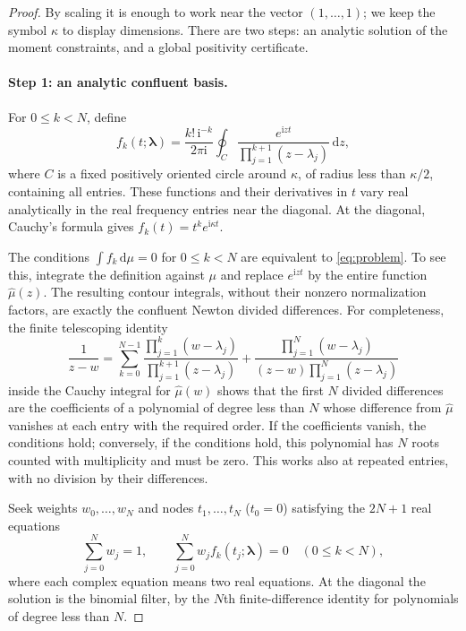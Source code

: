 \documentclass[11pt]{article}
\theoremstyle{remark}\newtheorem{remark}[theorem]{Remark}
\newcommand{\dd}{\,\mathrm d}
\newcommand{\ii}{\mathrm i}
\begin{document}
\begin{proof}
By scaling it is enough to work near the vector $(1,\dots,1)$; we keep the symbol $\kappa$ to display dimensions. There are two steps: an analytic solution of the moment constraints, and a global positivity certificate.

\paragraph{Step 1: an analytic confluent basis.} For $0\le k<N$, define
\[
 f_k(t;\boldsymbol\lambda)=\frac{k!\,\ii^{-k}}{2\pi\ii}
 \oint_C\frac{e^{\ii zt}}{\prod_{j=1}^{k+1}(z-\lambda_j)}\dd z,
\]
where $C$ is a fixed positively oriented circle around $\kappa$, of radius less than $\kappa/2$, containing all entries. These functions and their derivatives in $t$ vary real analytically in the real frequency entries near the diagonal. At the diagonal, Cauchy's formula gives $f_k(t)=t^ke^{\ii\kappa t}$.

The conditions $\int f_k\dd\mu=0$ for $0\le k<N$ are equivalent to \eqref{eq:problem}. To see this, integrate the definition against $\mu$ and replace $e^{\ii zt}$ by the entire function $\widehat\mu(z)$. The resulting contour integrals, without their nonzero normalization factors, are exactly the confluent Newton divided differences. For completeness, the finite telescoping identity
\[
 \frac1{z-w}=\sum_{k=0}^{N-1}\frac{\prod_{j=1}^k(w-\lambda_j)}{\prod_{j=1}^{k+1}(z-\lambda_j)}
 +\frac{\prod_{j=1}^N(w-\lambda_j)}{(z-w)\prod_{j=1}^N(z-\lambda_j)}
\]
inside the Cauchy integral for $\widehat\mu(w)$ shows that the first $N$ divided differences are the coefficients of a polynomial of degree less than $N$ whose difference from $\widehat\mu$ vanishes at each entry with the required order. If the coefficients vanish, the conditions hold; conversely, if the conditions hold, this polynomial has $N$ roots counted with multiplicity and must be zero. This works also at repeated entries, with no division by their differences.

Seek weights $w_0,\dots,w_N$ and nodes $t_1,\dots,t_N$ ($t_0=0$) satisfying the $2N+1$ real equations
\begin{equation}\label{eq:system}
 \sum_{j=0}^N w_j=1,\qquad \sum_{j=0}^N w_j f_k(t_j;\boldsymbol\lambda)=0\quad(0\le k<N),
\end{equation}
where each complex equation means two real equations. At the diagonal the solution is the binomial filter, by the $N$th finite-difference identity for polynomials of degree less than $N$.


\end{proof}
\end{document}
